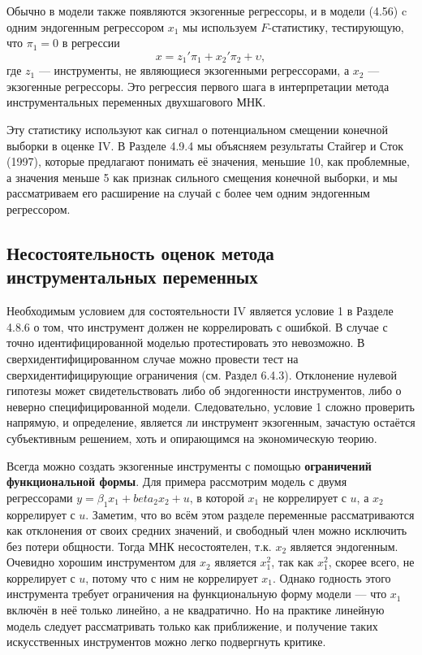 Обычно в модели также появляются экзогенные регрессоры, и в модели (4.56) c одним эндогенным регрессором $x_1$ мы используем $F$-статистику, тестирующую, что $\pi_1=0$ в регрессии 
\begin{equation}
x = z_1'\pi_1 + x_2'\pi_2+\upsilon,
\end{equation}
где $z_1$ --- инструменты, не являющиеся экзогенными регрессорами, а $x_2$ --- экзогенные регрессоры. Это регрессия первого шага в интерпретации метода инструментальных переменных двухшагового  МНК.

Эту статистику используют как сигнал о потенциальном смещении конечной выборки в оценке IV.  В Разделе 4.9.4 мы объясняем результаты Стайгер и Сток (1997), которые предлагают понимать её значения, меньшие 10, как проблемные, а значения меньше 5 как признак сильного смещения конечной выборки, и мы рассматриваем его расширение на случай с более чем одним эндогенным регрессором.

\subsection{Несостоятельность оценок метода инструментальных переменных}

Необходимым условием для состоятельности IV является условие 1 в Разделе 4.8.6 о том, что инструмент должен не коррелировать с ошибкой. В случае с точно идентифицированной моделью протестировать это невозможно. В сверхидентифицированном случае можно провести тест на сверхидентифицирующие ограничения (см. Раздел 6.4.3). Отклонение нулевой гипотезы может свидетельствовать либо об эндогенности инструментов, либо о неверно специфицированной модели. Следовательно, условие 1 сложно проверить напрямую, и определение, является ли инструмент экзогенным, зачастую остаётся субъективным решением, хоть и опирающимся на экономическую теорию.

Всегда можно создать экзогенные инструменты с помощью \textbf{ограничений функциональной формы}. Для примера рассмотрим модель с двумя регрессорами $y = \beta_1 x_1 +beta_2 x_2 +u$, в которой $x_1$ не коррелирует с $u$, а $x_2$ коррелирует с $u$. Заметим, что во всём этом разделе переменные рассматриваются как отклонения от своих средних значений, и свободный член можно исключить без потери общности. Тогда МНК несостоятелен, т.к. $x_2$ является эндогенным. Очевидно хорошим инструментом для $x_2$ является $x_1^2$, так как $x_1^2$, скорее всего, не коррелирует с $u$, потому что с ним не коррелирует $x_1$. Однако годность этого инструмента требует ограничения на функциональную форму модели --- что $x_1$ включён в неё только линейно, а не квадратично. Но на практике линейную модель следует рассматривать только как приближение, и получение таких искусственных инструментов можно легко подвергнуть критике.

